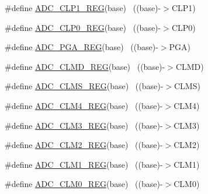 \begin{DoxyCompactItemize}
\item 
\#define \hyperlink{group___a_d_c___register___accessor___macros_ga17d3db4a239c595d8d2ec4fa8b064106}{A\+D\+C\+\_\+\+C\+L\+P1\+\_\+\+R\+EG}(base)                                          ~((base)-\/$>$C\+L\+P1)
\item 
\#define \hyperlink{group___a_d_c___register___accessor___macros_gafd619a5a2718979bc59f90085ac98c17}{A\+D\+C\+\_\+\+C\+L\+P0\+\_\+\+R\+EG}(base)                                          ~((base)-\/$>$C\+L\+P0)
\item 
\#define \hyperlink{group___a_d_c___register___accessor___macros_ga7e77b8e64203db15c157e72b2b4285ee}{A\+D\+C\+\_\+\+P\+G\+A\+\_\+\+R\+EG}(base)                                            ~((base)-\/$>$P\+GA)
\item 
\#define \hyperlink{group___a_d_c___register___accessor___macros_ga42b9eb64ac35d5b5dafcdf46cdaa5da6}{A\+D\+C\+\_\+\+C\+L\+M\+D\+\_\+\+R\+EG}(base)                                          ~((base)-\/$>$C\+L\+MD)
\item 
\#define \hyperlink{group___a_d_c___register___accessor___macros_gaebae30a3ca641d11bf4827c16cf97f40}{A\+D\+C\+\_\+\+C\+L\+M\+S\+\_\+\+R\+EG}(base)                                          ~((base)-\/$>$C\+L\+MS)
\item 
\#define \hyperlink{group___a_d_c___register___accessor___macros_ga9c3a854d793a88e2311f1f03b687e3e0}{A\+D\+C\+\_\+\+C\+L\+M4\+\_\+\+R\+EG}(base)                                          ~((base)-\/$>$C\+L\+M4)
\item 
\#define \hyperlink{group___a_d_c___register___accessor___macros_ga97002f7666f0790f47fc6bd12a083246}{A\+D\+C\+\_\+\+C\+L\+M3\+\_\+\+R\+EG}(base)                                          ~((base)-\/$>$C\+L\+M3)
\item 
\#define \hyperlink{group___a_d_c___register___accessor___macros_ga46547eb78fef1573713d39b1d8c578d5}{A\+D\+C\+\_\+\+C\+L\+M2\+\_\+\+R\+EG}(base)                                          ~((base)-\/$>$C\+L\+M2)
\item 
\#define \hyperlink{group___a_d_c___register___accessor___macros_gac5ca17b6333853551a5367159766f482}{A\+D\+C\+\_\+\+C\+L\+M1\+\_\+\+R\+EG}(base)                                          ~((base)-\/$>$C\+L\+M1)
\item 
\#define \hyperlink{group___a_d_c___register___accessor___macros_ga8d8e7a000934e8d6f37a0e6f8175de9e}{A\+D\+C\+\_\+\+C\+L\+M0\+\_\+\+R\+EG}(base)                                          ~((base)-\/$>$C\+L\+M0)
\item 

\end{DoxyCompactItemize}
